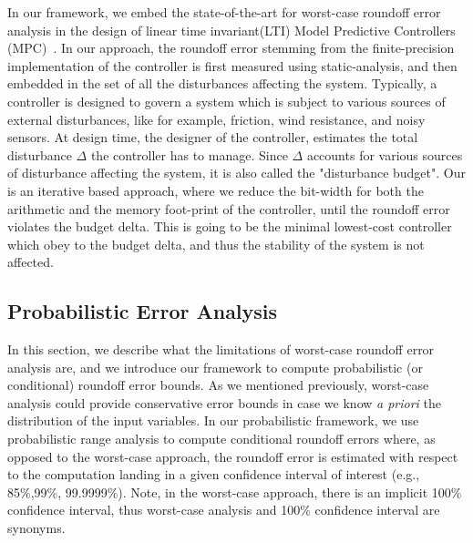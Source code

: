 In our framework, we embed the state-of-the-art for worst-case roundoff error analysis in the design of linear time invariant(LTI) Model Predictive Controllers (MPC)~\cite{mpc}.
%
In our approach, the roundoff error stemming from the finite-precision implementation of the controller is first measured using static-analysis, and then embedded in the set of all the disturbances affecting the system.
%
Typically, a controller is designed to govern a system which is subject to various sources of external disturbances, like for example, friction, wind resistance, and noisy sensors.
%
At design time, the designer of the controller, estimates the total disturbance $\Delta$ the controller has to manage.
%
Since $\Delta$ accounts for various sources of disturbance affecting the system, it is also called the "disturbance budget".
%
%
Our is an iterative based approach, where we reduce the bit-width for both the arithmetic and the memory foot-print of the controller, until the roundoff error violates the budget delta.
%
This is going to be the minimal lowest-cost controller which obey to the budget delta, and thus the stability of the system is not affected.
%

%
%  
%  
%
%
%
%
\subsection{Probabilistic Error Analysis}
\label{sec:prob}
%
In this section, we describe what the limitations of worst-case roundoff error analysis are, and we introduce our framework to compute probabilistic (or conditional) roundoff error bounds.
%
As we mentioned previously, worst-case analysis could provide conservative error bounds in case we know \emph{a priori} the distribution of the input variables. 
%
%
In our probabilistic framework, we use probabilistic range analysis to compute conditional roundoff errors where, as opposed to the worst-case approach, the roundoff error is estimated with respect to the computation landing in a given confidence interval of interest (e.g., 85\%,99\%, 99.9999\%).
%
Note, in the worst-case approach, there is an implicit 100\% confidence interval, thus worst-case analysis and 100\% confidence interval are synonyms.
%

